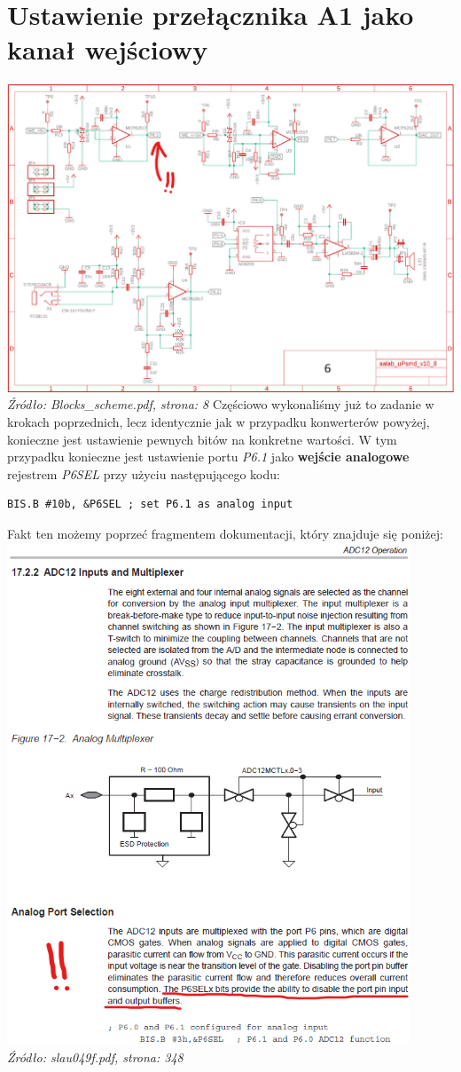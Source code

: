 \documentclass{article}
\begin{document}
\section{Ustawienie przełącznika A1 jako kanał wejściowy}
\includegraphics[width=\textwidth]{"../adc_img/Blocks_scheme_8.png"}
\textit{Źródło: Blocks\_scheme.pdf, strona: 8}
Częściowo wykonaliśmy już to zadanie w krokach poprzednich, lecz identycznie jak w przypadku konwerterów powyżej, konieczne jest ustawienie pewnych bitów na konkretne wartości.
W tym przypadku konieczne jest ustawienie portu \textit{P6.1} jako \textbf{wejście analogowe} rejestrem \textit{P6SEL} przy użyciu następującego kodu:
\begin{verbatim}
BIS.B #10b, &P6SEL ; set P6.1 as analog input \end{verbatim}
Fakt ten możemy poprzeć fragmentem dokumentacji, który znajduje się poniżej: \\
\includegraphics[width=0.9\textwidth]{"../adc_img/slau049f_348.png"} \\
\textit{Źródło: slau049f.pdf, strona: 348}
\end{document}
